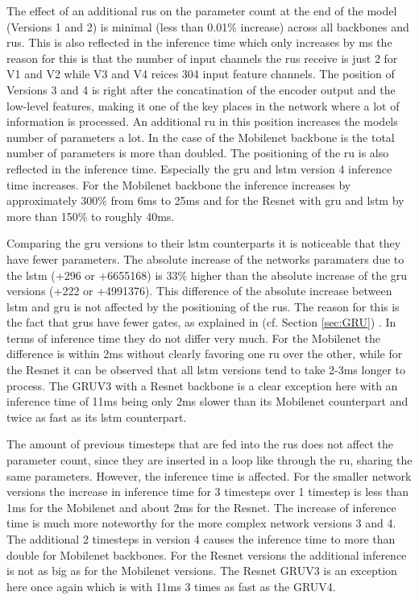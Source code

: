 \documentclass[11pt,
  paper=a4, 
  bibliography=totocnumbered,
	captions=tableheading,
	BCOR=10mm
]{scrreprt}
\theoremstyle{definition}
\newcommand{\secref}[1]{%
	\IfBeginWith{#1}{chap:}{%
		(cf. Chapter \ref{#1})}%
		{(cf. Section \ref{#1})}%
		}
\begin{document}
The effect of an additional \glspl{ru} on the parameter count at the end of the model (Versions 1 and 2) is minimal (less than 0.01\% increase) across all backbones and \glspl{ru}.
This is also reflected in the inference time which only increases by \gls{ms}
the reason for this is that the number of input channels the \glspl{ru} receive is just 2 for V1 and V2 while V3 and V4 reices 304 input feature channels.
The position of Versions 3 and 4 is right after the concatination of the encoder output and the low-level features, making it one of the key places in the network where a lot of information is processed.
An additional \gls{ru} in this position increases the models number of parameters a lot. 
In the case of the Mobilenet backbone is the total number of parameters is more than doubled.  
The positioning of the \gls{ru} is also reflected in the inference time.
Especially the \gls{gru} and \gls{lstm} version 4 inference time increases.
For the Mobilenet backbone the inference increases by approximately 300\% from 6\gls{ms} to 25\gls{ms} and for the Resnet with \gls{gru} and \gls{lstm} by more than 150\% to roughly 40\gls{ms}. 


Comparing the \gls{gru} versions to their \gls{lstm} counterparts it is noticeable that they have fewer parameters.
The absolute increase of the networks paramaters due to the \gls{lstm} (+296 or +6655168) is 33\% higher than the absolute increase of the \gls{gru} versions (+222 or +4991376).
This difference of the absolute increase between \gls{lstm} and \gls{gru} is not affected by the positioning of the \glspl{ru}.
The reason for this is the fact that \glspl{gru} have fewer gates, as explained in \secref{sec:GRU}.
In terms of inference time they do not differ very much. 
For the Mobilenet the difference is within 2\gls{ms} without clearly favoring one \gls{ru} over the other, while for the Resnet it can be observed that all \gls{lstm} versions tend to take 2-3\gls{ms} longer to process.
The GRUV3 with a Resnet backbone is a clear exception here with an inference time of 11\gls{ms} being only 2\gls{ms} slower than its Mobilenet counterpart and twice as fast as its \gls{lstm} counterpart.

The amount of previous timesteps that are fed into the \glspl{ru} does not affect the parameter count, since they are inserted in a loop like through the \gls{ru}, sharing the same parameters.
However, the inference time is affected.
For the smaller network versions the increase in inference time for 3 timesteps over 1 timestep is less than 1\gls{ms} for the Mobilenet and about 2\gls{ms} for the Resnet.
The increase of inference time is much more noteworthy for the more complex network versions 3 and 4.
The additional 2 timesteps in version 4 causes the inference time to more than double for Mobilenet backbones.
For the Resnet versions the additional inference is not as big as for the Mobilenet versions.
The Resnet GRUV3 is an exception here once again which is with 11\gls{ms} 3 times as fast as the GRUV4.
\end{document}
